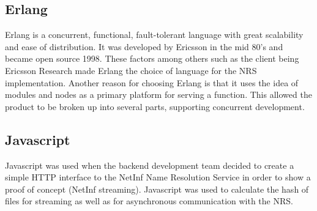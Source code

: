 \subsection{Erlang}
Erlang is a concurrent, functional, fault-tolerant language with great scalability and ease of distribution. It was developed by Ericsson in the mid 80's and became open source 1998.\cite{otpInAction} These factors among others such as the client being Ericsson Research made Erlang the choice of language for the NRS implementation.
Another reason for choosing Erlang is that it uses the idea of modules and nodes as a primary platform for serving a function. This allowed the product to be broken up into several parts, supporting concurrent development.
\subsection{Javascript}
Javascript was used when the backend development team decided to create a simple HTTP interface to the NetInf Name Resolution Service in order to show a proof of concept (NetInf streaming). Javascript was used to calculate the hash of files for streaming as well as for asynchronous communication with the NRS.
